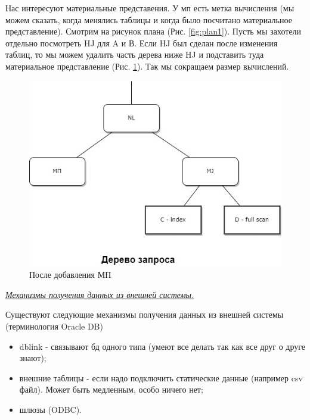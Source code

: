 Нас интересуют материальные представения. У мп есть метка вычисления (мы можем сказать, когда менялись таблицы и когда было посчитано материальное представление). Смотрим на рисунок плана (Рис. \ref{fig:plan1}). Пусть мы захотели отдельно посмотреть HJ для A и В. Если HJ был сделан после изменения таблиц, то мы можем удалить часть дерева ниже HJ и подставить туда материальное представление (Рис. \ref{fig:plan2}). Так мы сокращаем размер вычислений.  

 \begin{figure}[h!]
     \centering
     \includegraphics[scale = 0.5]{5/plan2.jpg}
     \caption{После добавления МП}
     \label{fig:plan2}
 \end{figure}
 
\begin{center}
\textit{\underline{Механизмы получения данных из внешней системы.}}
\end{center}

Существуют следующие механизмы получения данных из внешней системы (терминология  Oracle DB)
\begin{itemize}
    \item  dblink -  связывают бд одного типа (умеют все делать так как все друг о друге знают);
    \item внешние таблицы - если надо подключить статические данные (например csv файл). Может быть медленным, особо ничего нет;
    \item шлюзы (ODBC).
\end{itemize}

